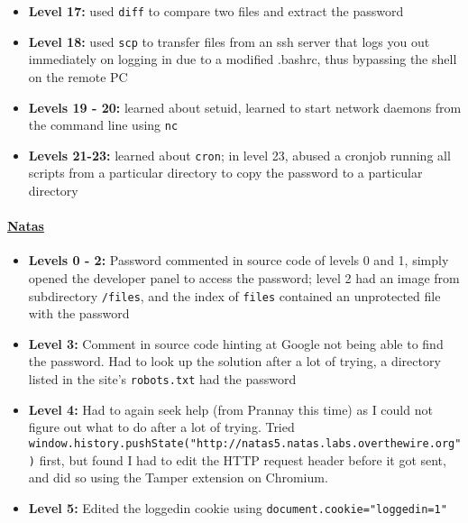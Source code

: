 \documentclass{article}
\def\code#1{\texttt{#1}}
\begin{document}
\begin{itemize}
\begin{itemize}
            \item \textbf{Level 17: } used \code{diff} to compare two files and extract the password

            \item \textbf{Level 18: } used \code{scp} to transfer files from an ssh server that logs you out immediately on logging in due to a modified .bashrc, thus bypassing the shell on the remote PC

            \item \textbf{Levels 19 - 20: } learned about setuid, learned to start network daemons from the command line using \code{nc}

            \item \textbf{Levels 21-23: } learned about \code{cron}; in level 23, abused a cronjob running all scripts from a particular directory to copy the password to a particular directory

        \end{itemize}

        \paragraph{\href{http://overthewire.org/wargames/bandit}{Natas}}

        \begin{itemize}

            \item \textbf{Levels 0 - 2: } Password commented in source code of levels 0 and 1, simply opened the developer panel to access the password; level 2 had an image from subdirectory \code{/files}, and the index of \code{files} contained an unprotected file with the password

            \item \textbf{Level 3: } Comment in source code hinting at Google not being able to find the password. Had to look up the solution after a lot of trying, a directory listed in the site's \code{robots.txt} had the password

            \item \textbf{Level 4: } Had to again seek help (from Prannay this time) as I could not figure out what to do after a lot of trying. Tried \code{window.history.pushState("http://natas5.natas.labs.overthewire.org")} first, but found I had to edit the HTTP request header before it got sent, and did so using the Tamper extension on Chromium.

            \item \textbf{Level 5: } Edited the loggedin cookie using \code{document.cookie="loggedin=1"}


\end{itemize}
\end{itemize}
\end{document}
